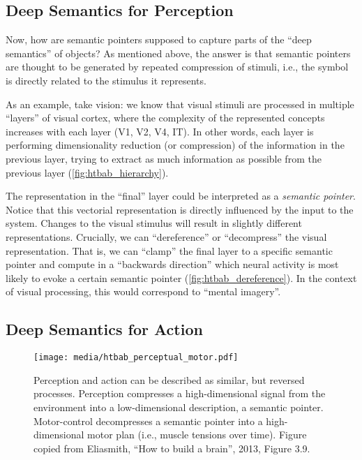 \documentclass[10pt,letterpaper,oneside]{article}
\begin{document}
\subsection{Deep Semantics for Perception}

Now, how are semantic pointers supposed to capture parts of the \enquote{deep semantics} of objects? As mentioned above, the answer is that semantic pointers are thought to be generated by repeated compression of stimuli, i.e., the symbol is directly related to the stimulus it represents.

As an example, take vision: we know that visual stimuli are processed in multiple \enquote{layers} of visual cortex, where the complexity of the represented concepts increases with each layer (V1, V2, V4, IT). In other words, each layer is performing dimensionality reduction (or compression) of the information in the previous layer, trying to extract as much information as possible from the previous layer (\cref{fig:htbab_hierarchy}).

The representation in the \enquote{final} layer could be interpreted as a \emph{semantic pointer}. Notice that this vectorial representation is directly influenced by the input to the system. Changes to the visual stimulus will result in slightly different representations. Crucially, we can \enquote{dereference} or \enquote{decompress} the visual representation. That is, we can \enquote{clamp} the final layer to a specific semantic pointer and compute in a \enquote{backwards direction} which neural activity is most likely to evoke a certain semantic pointer (\cref{fig:htbab_dereference}). In the context of visual processing, this would correspond to \enquote{mental imagery}.

\subsection{Deep Semantics for Action}

\begin{figure}
	\centering
	\texttt{[image: media/htbab\_perceptual\_motor.pdf]}
	\caption{Perception and action can be described as similar, but reversed processes. Perception compresses a high-dimensional signal from the environment into a low-dimensional description, a semantic pointer. Motor-control decompresses a semantic pointer into a high-dimensional motor plan (i.e., muscle tensions over time). Figure copied from Eliasmith, \enquote{How to build a brain}, 2013, Figure 3.9.}
\end{figure}
\end{document}
